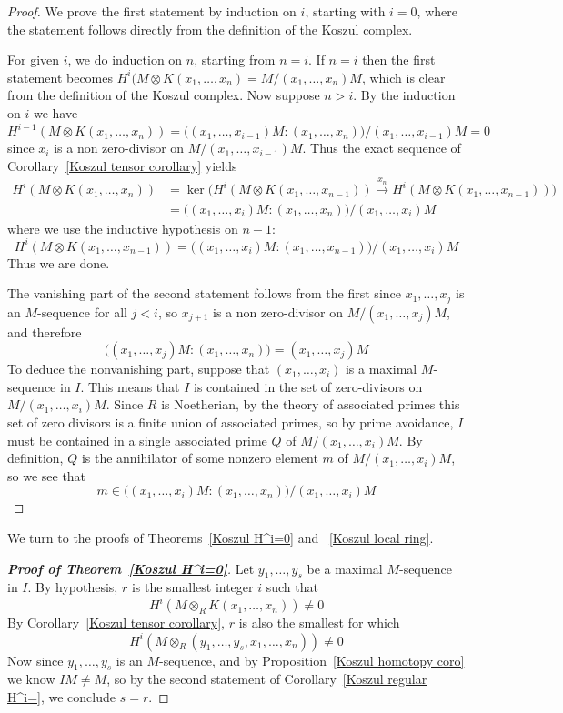\begin{proof}
We prove the first statement by induction on $i$, starting with $i=0$, where the statement follows directly from the definition of the Koszul
complex.\par
For given $i$, we do induction on $n$, starting from $n=i$. If $n=i$ then the first statement becomes $H^i(M\otimes K(x_1,\dots,x_n)=M/(x_1,\dots,x_n)M$, which is clear from the definition of the Koszul complex. Now suppose $n>i$. By the induction on $i$ we have
\[H^{i-1}(M\otimes K(x_1,\dots,x_n))=\big((x_1,\dots,x_{i-1})M:(x_1,\dots,x_n)\big)/(x_1,\dots,x_{i-1})M=0\]
since $x_i$ is a non zero-divisor on $M/(x_1,\dots,x_{i-1})M$. Thus the exact sequence of Corollary~\ref{Koszul tensor corollary} yields
\begin{align*}
H^i(M\otimes K(x_1,\dots,x_n))&=\ker\big(H^i(M\otimes K(x_1,\dots,x_{n-1}))\stackrel{x_n}{\to}H^i(M\otimes K(x_1,\dots,x_{n-1}))\big)\\
&=\big((x_1,\dots,x_i)M:(x_1,\dots,x_n)\big)/(x_1,\dots,x_i)M
\end{align*}
where we use the inductive hypothesis on $n-1$:
\[H^i(M\otimes K(x_1,\dots,x_{n-1}))=\big((x_1,\dots,x_i)M:(x_1,\dots,x_{n-1})\big)/(x_1,\dots,x_i)M\]
Thus we are done.\par
The vanishing part of the second statement follows from the first since
$x_1,\dots,x_j$ is an $M$-sequence for all $j<i$, so $x_{j+1}$ is a non zero-divisor on $M/(x_1,\dots,x_j)M$, and therefore
\[\big((x_1,\dots,x_j)M:(x_1,\dots,x_n)\big)=(x_1,\dots,x_j)M\]
To deduce the nonvanishing part, suppose that $(x_1,\dots,x_i)$ is a maximal $M$-sequence in $I$. This means that $I$ is contained in the set of zero-divisors on $M/(x_1,\dots,x_i)M$. Since $R$ is Noetherian, by the theory of associated primes this set of zero divisors is a finite union of associated primes, so by prime avoidance, $I$ must be contained in a single associated prime $Q$ of $M/(x_1,\dots,x_i)M$. By definition, $Q$ is the annihilator of some nonzero element $m$ of $M/(x_1,\dots,x_i)M$, so we see that
\[m\in\big((x_1,\dots,x_i)M:(x_1,\dots,x_n)\big)/(x_1,\dots,x_i)M\]
\end{proof}
We turn to the proofs of Theorems~\ref{Koszul H^i=0} and ~\ref{Koszul local ring}.
\begin{proof}[\textbf{Proof of Theorem~\ref{Koszul H^i=0}}]
Let $y_1,\dots,y_s$ be a maximal $M$-sequence in $I$. By hypothesis, $r$ is the smallest integer $i$ such that
\[H^i(M\otimes_RK(x_1,\dots,x_n))\neq 0\]
By Corollary~\ref{Koszul tensor corollary}, $r$ is also the smallest for which
\[H^i(M\otimes_R(y_1,\dots,y_s,x_1,\dots,x_n))\neq 0\]
Now since $y_1,\dots,y_s$ is an $M$-sequence, and by Proposition~\ref{Koszul homotopy coro} we know $IM\neq M$, so by the second statement of Corollary~\ref{Koszul regular H^i=}, we conclude $s=r$.
\end{proof}
